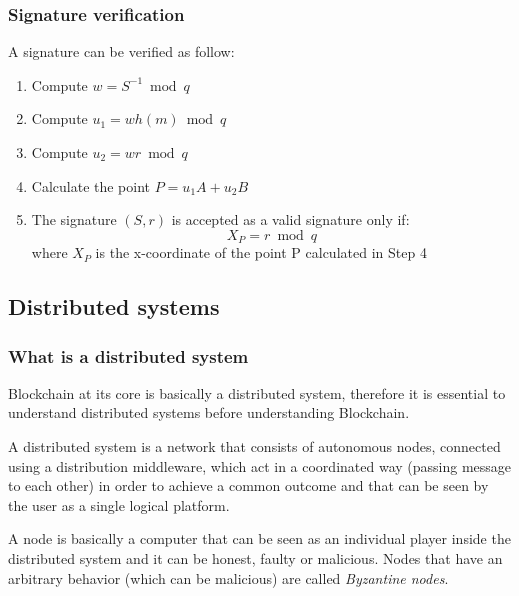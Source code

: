 \subsubsection{Signature verification}
A signature can be verified as follow:
\begin{enumerate}
  \item Compute ${w=S^{-1}\bmod q}$
  \item Compute ${u_1=w  h(m)\bmod q}$
  \item Compute ${u_2=w  r \bmod q}$
  \item Calculate the point ${P=u_1  A + u_2  B}$
  \item The signature ${(S,r)}$ is accepted as a valid signature only if:
   \[{X_P=r \bmod q}\]
   where $X_P$ is the x-coordinate of the point P calculated in Step 4
\end{enumerate}











\subsection{Distributed systems}
\subsubsection{What is a distributed system}
Blockchain at its core is basically a distributed system, therefore it is essential
to understand distributed systems before understanding Blockchain.

A distributed system is a network that consists of autonomous nodes, connected
using a distribution middleware, which act in a coordinated way (passing message
to each other) in order to achieve a common outcome and that can be seen by the
user as a single logical platform.

A node is basically a computer that can be seen as an individual player inside
the distributed system and it can be honest, faulty or malicious. Nodes that
have an arbitrary behavior (which can be malicious) are called \emph{Byzantine nodes}.

